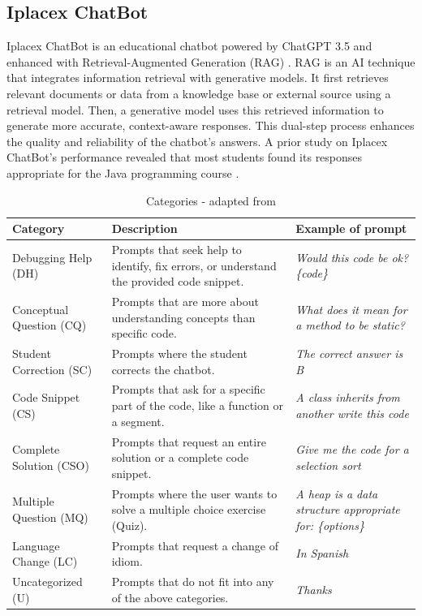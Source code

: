 \documentclass[sn-apa]{sn-jnl} %
\begin{document}
\subsection{Iplacex ChatBot}

Iplacex ChatBot is an educational chatbot powered by ChatGPT 3.5 and enhanced
with Retrieval-Augmented Generation (RAG) \citep{Sun24}. RAG is an AI technique
that integrates information retrieval with generative models. It first retrieves
relevant documents or data from a knowledge base or external source using a
retrieval model. Then, a generative model uses this retrieved information to
generate more accurate, context-aware responses. This dual-step process enhances
the quality and reliability of the chatbot's answers. A prior study on
Iplacex ChatBot's performance revealed that most students found its responses
appropriate for the Java programming course \citep{Hoyos24}.

\begin{table}[htbp]
  \caption{Categories - adapted from \cite{Ghimire24}}
  \begin{center}
    \renewcommand{\arraystretch}{1.2} %
    \begin{tabular}{p{4.1cm} p{4cm} p{3.7cm}} %
      \hline
      \textbf{Category} & \textbf{Description} & \textbf{Example of prompt} \\
      \hline
      Debugging Help (DH) & Prompts that seek help to identify, fix errors, or understand the provided code snippet. & \textit{Would this code be ok? \{code\}} \\
      Conceptual Question (CQ) & Prompts that are more about understanding concepts than specific code. & \textit{What does it mean for a method to be static?} \\
      Student Correction (SC) & Prompts where the student corrects the chatbot. & \textit{The correct answer is B} \\
      Code Snippet  (CS) & Prompts that ask for a specific part of the code, like a function or a segment. & \textit{A class inherits from another write this code} \\
      Complete Solution (CSO) & Prompts that request an entire solution or a complete code snippet. & \textit{Give me the code for a selection sort} \\
      Multiple Question (MQ) & Prompts where the user wants to solve a multiple choice exercise (Quiz). & \textit{A heap is a data structure appropriate for: \{options\}} \\
      Language Change (LC) & Prompts that request a change of idiom. & \textit{In Spanish} \\
      Uncategorized (U) & Prompts that do not fit into any of the above categories. & \textit{Thanks} \\
      \hline
    \end{tabular}
    \label{tab:categories}
  \end{center}
\end{table}
\end{document}
